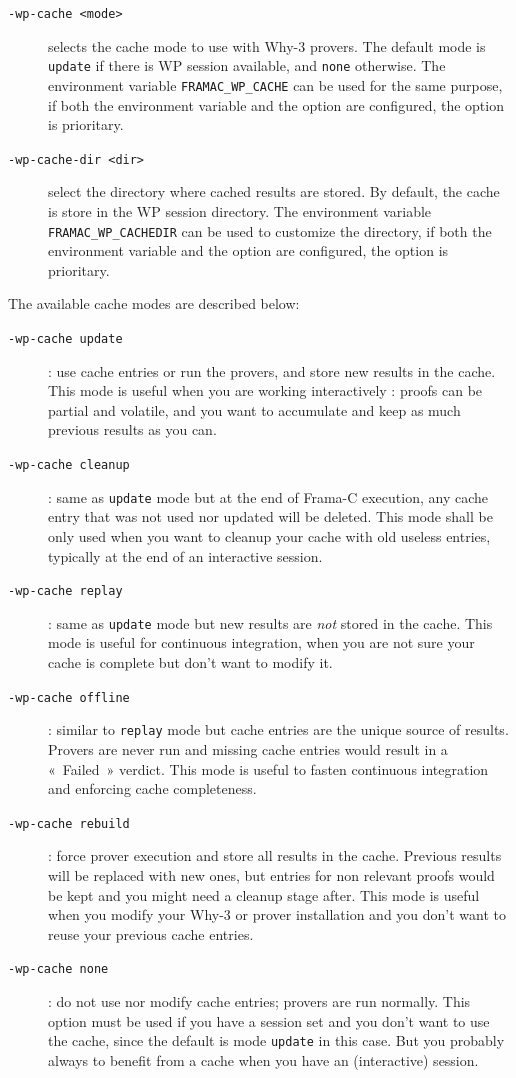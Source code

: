 \begin{description}
\item[\tt -wp-cache <mode>] selects the cache mode to use with \textsf{Why-3}
  provers. The default mode is \verb'update' if there is \textsf{WP} session
  available, and \verb+none+ otherwise. The environment variable
  \verb|FRAMAC_WP_CACHE| can be used for the same purpose, if both the
  environment variable and the option are configured, the option is prioritary.

\item[\tt -wp-cache-dir <dir>] select the directory where cached results are
  stored. By default, the cache is store in the \textsf{WP} session
  directory. The environment variable \verb|FRAMAC_WP_CACHEDIR| can be used to
  customize the directory, if both the environment variable and the option
  are configured, the option is prioritary.
\end{description}

The available cache modes are described below:
\begin{description}
\item [\tt -wp-cache update]: use cache entries or run the provers, and store new results in the cache. This mode is useful when you are working interactively : proofs can be partial and volatile, and you want to accumulate and keep as much previous results as you can.
\item [\tt -wp-cache cleanup]: same as \verb+update+ mode but at the end of \textsf{Frama-C} execution, any cache entry that was not used nor updated will be deleted. This mode shall be only used when you want to cleanup your cache with old useless entries, typically at the end of an interactive session.
\item [\tt -wp-cache replay]: same as \verb+update+ mode but new results are \emph{not} stored in the cache. This mode is useful for continuous integration, when you are not sure your cache is complete but don't want to modify it.
\item [\tt -wp-cache offline]: similar to \verb+replay+ mode but cache entries are the unique source of results. Provers are never run and missing cache entries would result in a «~Failed~» verdict. This mode is useful to fasten continuous integration and enforcing cache completeness.
\item [\tt -wp-cache rebuild]: force prover execution and store all results in the cache. Previous results will be replaced with new ones, but entries for non relevant proofs would be kept and you might need a cleanup stage after. This mode is useful when you modify your \textsf{Why-3} or prover installation and you don't want to reuse your previous cache entries.
\item [\tt -wp-cache none]: do not use nor modify cache entries; provers are run normally. This option must be used if you have a session set and you don't want to use the cache, since the default is mode \verb+update+ in this case. But you probably always to benefit from a cache when you have an (interactive) session.
\end{description}

